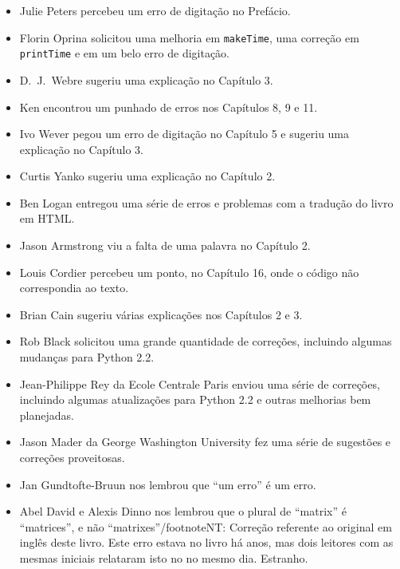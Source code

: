 \documentclass[10pt]{book}
\begin{document}
\begin {itemize}
\item Julie Peters percebeu um erro de digitação no Prefácio.

\item Florin Oprina solicitou uma melhoria em {\tt makeTime},
uma correção em {\tt printTime} e em um belo erro de digitação.

\item D.~J.~Webre sugeriu uma explicação no Capítulo 3.

\item Ken encontrou um punhado de erros nos Capítulos 8, 9 e 11.

\item Ivo Wever pegou um erro de digitação no Capítulo 5 e sugeriu uma explicação
no Capítulo 3.

\item Curtis Yanko sugeriu uma explicação no Capítulo 2.

\item Ben Logan entregou uma série de erros e problemas com a tradução
do livro em HTML.

\item Jason Armstrong viu a falta de uma palavra no Capítulo 2.

\item Louis Cordier percebeu um ponto, no Capítulo 16, onde o código
não correspondia ao texto.

\item Brian Cain sugeriu várias explicações nos Capítulos 2 e 3.

\item Rob Black solicitou uma grande quantidade de correções, incluindo algumas
mudanças para Python 2.2.

\item Jean-Philippe Rey da Ecole Centrale
Paris enviou uma série de correções, incluindo algumas atualizações para Python 2.2
e outras melhorias bem planejadas.

\item Jason Mader da George Washington University fez uma série
de sugestões e correções proveitosas.

\item Jan Gundtofte-Bruun nos lembrou que ``um erro'' é um erro.

\item Abel David e Alexis Dinno nos lembrou que o plural de
``matrix'' é ``matrices'', e não ``matrixes''/footnote{NT: Correção referente ao original em inglês deste livro}. Este erro estava no
livro há anos, mas dois leitores com as mesmas iniciais relataram isto no
no mesmo dia. Estranho.


\end{itemize}
\end{document}
